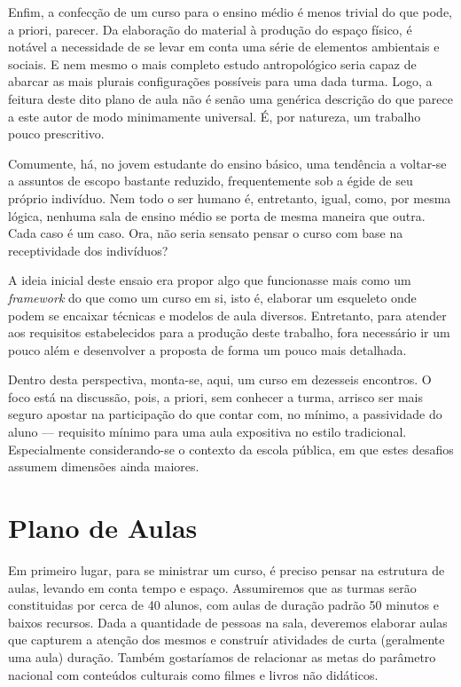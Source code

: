 \documentclass[12pt,a4paper]{article}
\begin{document}
	Enfim, a confecção de um curso para o ensino médio é menos trivial do que 
	pode, a priori, parecer. Da elaboração do material à produção do 
	espaço físico, é notável a necessidade de se levar em conta uma 
	série de elementos ambientais e sociais. E nem mesmo o mais completo
	estudo antropológico seria capaz de abarcar as mais plurais 
	configurações possíveis para uma dada turma. Logo, a feitura deste 
	dito plano de aula não é senão uma genérica descrição do que 
	parece a este autor de modo minimamente universal. É, por natureza, 
	um trabalho pouco prescritivo. 
	
	Comumente, há, no jovem estudante do ensino básico, uma tendência a 
	voltar-se a assuntos de escopo bastante reduzido, frequentemente sob 
	a égide de seu próprio indivíduo. Nem todo o ser humano é, entretanto, 
	igual, como, por mesma lógica, nenhuma sala de ensino médio se porta de 
	mesma 	maneira que outra. Cada caso é um caso. Ora, não seria sensato 
	pensar o curso com base na receptividade dos indivíduos? 
	
	A ideia inicial deste ensaio era propor algo que funcionasse mais como 
	um \textit{framework} do que como um curso em si, isto é, 
	elaborar um esqueleto onde podem se encaixar técnicas e modelos de 
	aula diversos. Entretanto, para atender aos requisitos estabelecidos para 
	a produção deste trabalho, fora necessário ir um pouco além e desenvolver 
	a proposta de forma um pouco mais detalhada. 
	
	Dentro desta perspectiva, monta-se, aqui, um curso em dezesseis 
	encontros. O foco está na discussão, pois, a priori, sem conhecer a turma, 
	arrisco ser mais seguro apostar na participação do que contar com, no 
	mínimo, a passividade do aluno --- requisito mínimo para uma aula 
	expositiva no estilo tradicional. Especialmente considerando-se o contexto 
	da escola pública, em que estes desafios assumem dimensões ainda maiores. 
	
	
	\newpage
	
	\section{Plano de Aulas}
	
	Em primeiro lugar, para se ministrar um curso, é preciso pensar na 
	estrutura de aulas, levando em conta tempo e espaço. Assumiremos que 
	as turmas serão constituidas por cerca de 40 alunos, com aulas de 
	duração padrão 50 minutos e baixos recursos. Dada a quantidade de 
	pessoas na sala, deveremos elaborar aulas que capturem a atenção dos 
	mesmos e construír atividades de curta (geralmente uma aula) duração.
	Também gostaríamos de relacionar as metas do parâmetro nacional com 
	conteúdos culturais como filmes e livros não didáticos.	
\end{document}
